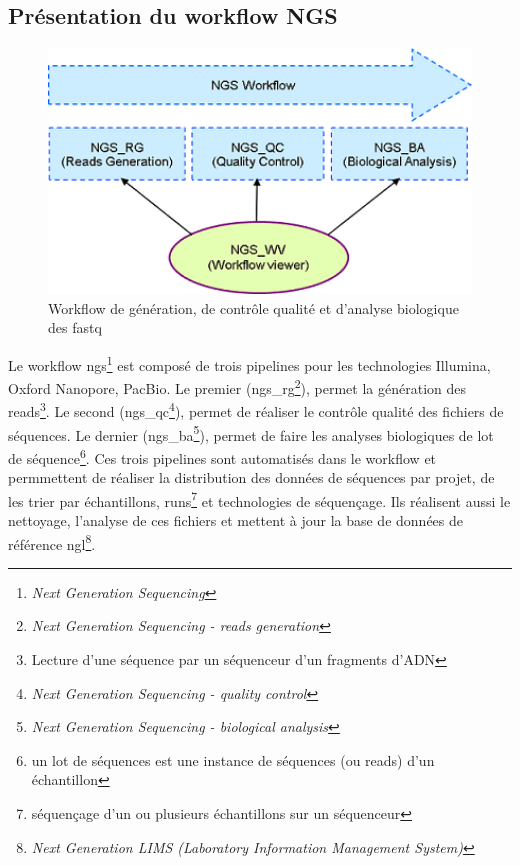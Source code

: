 \subsection{Présentation du workflow NGS}
\begin{minipage}{0.45\textwidth}
	\begin{figure}[H]
		\centering
		\includegraphics[width=1\textwidth]{img/Workflow.png}
		\caption{\footnotesize{Workflow de génération, de contrôle qualité et d’analyse biologique des fastq}}
		\label{worflow-genoscope}
	\end{figure}
\end{minipage} 
\hfill
\begin{minipage}{0.45\textwidth}
	Le workflow ngs\footnote{\emph{Next Generation Sequencing}} est composé de trois pipelines pour les technologies Illumina, Oxford Nanopore, PacBio. Le premier (ngs\_rg\footnote{\emph{Next Generation Sequencing - reads generation}}), permet la génération des reads\footnote{Lecture d'une séquence par un séquenceur d'un fragments d'ADN}. Le second (ngs\_qc\footnote{\emph{Next Generation Sequencing - quality control}}), permet de réaliser le contrôle qualité des fichiers de séquences. Le dernier (ngs\_ba\footnote{\emph{Next Generation Sequencing - biological analysis}}), permet de faire les analyses biologiques de lot de séquence\footnote{un lot de séquences est une instance de séquences (ou reads) d'un échantillon}. Ces trois pipelines sont automatisés dans le workflow et permmettent de réaliser la distribution des données de séquences par projet, de les trier par échantillons, runs\footnote{séquençage d'un ou plusieurs échantillons sur un séquenceur} et technologies de séquençage. Ils réalisent aussi le nettoyage, l'analyse de ces fichiers et mettent à jour la base de données de référence ngl\footnote{\emph{Next Generation LIMS (Laboratory Information Management System)}}.
\end{minipage} 

